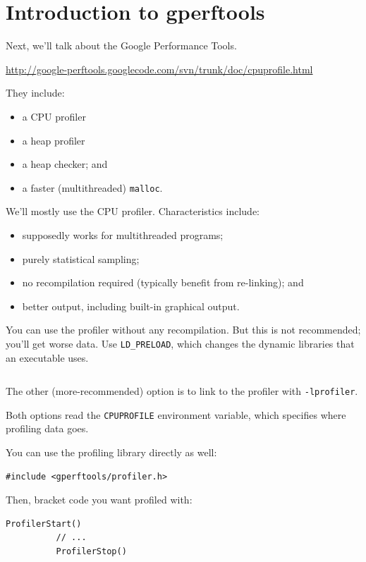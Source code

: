 \section*{Introduction to gperftools}
Next, we'll talk about the Google Performance Tools. 
\begin{center}
\url{http://google-perftools.googlecode.com/svn/trunk/doc/cpuprofile.html}
\end{center}
They include:
      \begin{itemize}
        \item a CPU profiler
        \item a heap profiler
        \item a heap checker; and 
        \item a faster (multithreaded) {\tt malloc}.
      \end{itemize}

We'll mostly use the CPU profiler. Characteristics include:
      \begin{itemize}
        \item  supposedly works for
multithreaded programs;
        \item purely statistical sampling;
        \item no recompilation required (typically benefit from re-linking); and
        \item better output, including built-in graphical output.
      \end{itemize}

You can use the profiler without any recompilation. But this is not recommended;
you'll get worse data. Use {\tt LD\_PRELOAD}, which changes the dynamic libraries that
an executable uses.

  \begin{lstlisting}[basicstyle=\scriptsize]
  % LD_PRELOAD="/usr/lib/libprofiler.so" CPUPROFILE=test.prof ./test
  \end{lstlisting}

The other (more-recommended) option is to link to the profiler with {\tt -lprofiler}.

Both options read the {\tt CPUPROFILE} environment variable, which
specifies where profiling data goes.

You can use the profiling library directly as well:
\begin{lstlisting}[basicstyle=\scriptsize]
          #include <gperftools/profiler.h>
\end{lstlisting}
Then, bracket code you want profiled with:
\begin{lstlisting}[basicstyle=\scriptsize]
          ProfilerStart()
          // ...
          ProfilerStop()
\end{lstlisting}
    
